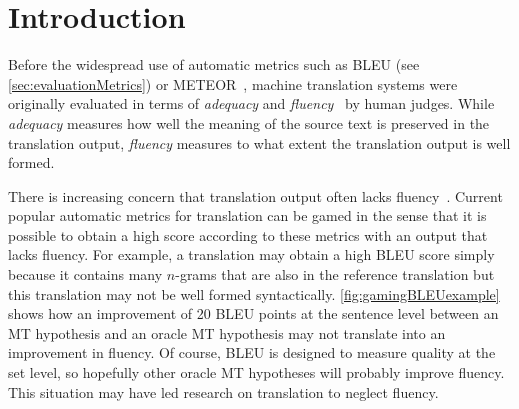 
\section{Introduction}

Before the widespread use of automatic metrics such as
BLEU (see \autoref{sec:evaluationMetrics}) or
METEOR~\citep{banerjee-lavie:2005:MTSumm}, machine translation
systems were originally evaluated in terms of \emph{adequacy}
and \emph{fluency}~\citep{white-oconnell-carlson:1993:HLT} by human judges.
While \emph{adequacy} measures how well the meaning of the
source text is preserved in the translation output, \emph{fluency}
measures to what extent the translation output is well formed.

There is increasing concern that translation output
often lacks fluency~\citep{knight:2007:TALK}.
Current popular automatic metrics for translation can be gamed in the
sense that it is possible to obtain a high score according to these
metrics with an output that lacks fluency.
For example, a translation may obtain a high BLEU score simply
because it contains many $n$-grams that are also in the reference
translation but this translation may not be well formed syntactically.
\autoref{fig:gamingBLEUexample} shows how an improvement of
20 BLEU points at the sentence level between an MT hypothesis
and an oracle MT hypothesis may not translate into
an improvement in fluency. Of course, BLEU is designed to
measure quality at the set level, so hopefully other oracle MT
hypotheses will probably improve fluency.
This situation may have led research on translation to neglect fluency.
%

